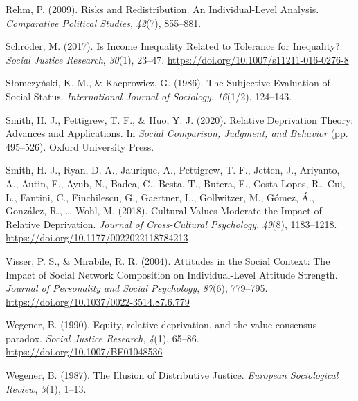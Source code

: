 \documentclass[
  12pt,
]{book}
\newlength{\cslhangindent}
\newlength{\cslentryspacingunit} %
\newenvironment{CSLReferences}[2] %
 {%
  \setlength{\parindent}{0pt}
  \ifodd #1
  \let\oldpar\par
  \def\par{\hangindent=\cslhangindent\oldpar}
  \fi
  \setlength{\parskip}{#2\cslentryspacingunit}
 }%
 {}
\begin{document}
\begin{CSLReferences}{1}{0}
\leavevmode{}%
Rehm, P. (2009). Risks and {Redistribution}. {An Individual-Level Analysis}. \emph{Comparative Political Studies}, \emph{42}(7), 855--881.

\leavevmode{}%
Schröder, M. (2017). Is {Income Inequality Related} to {Tolerance} for {Inequality}? \emph{Social Justice Research}, \emph{30}(1), 23--47. \url{https://doi.org/10.1007/s11211-016-0276-8}

\leavevmode{}%
Słomczyński, K. M., \& Kacprowicz, G. (1986). The {Subjective Evaluation} of {Social Status}. \emph{International Journal of Sociology}, \emph{16}(1/2), 124--143.

\leavevmode{}%
Smith, H. J., Pettigrew, T. F., \& Huo, Y. J. (2020). Relative {Deprivation Theory}: {Advances} and {Applications}. In \emph{Social {Comparison}, {Judgment}, and {Behavior}} (pp. 495--526). {Oxford University Press}.

\leavevmode{}%
Smith, H. J., Ryan, D. A., Jaurique, A., Pettigrew, T. F., Jetten, J., Ariyanto, A., Autin, F., Ayub, N., Badea, C., Besta, T., Butera, F., Costa-Lopes, R., Cui, L., Fantini, C., Finchilescu, G., Gaertner, L., Gollwitzer, M., Gómez, Á., González, R., \ldots{} Wohl, M. (2018). Cultural {Values Moderate} the {Impact} of {Relative Deprivation}. \emph{Journal of Cross-Cultural Psychology}, \emph{49}(8), 1183--1218. \url{https://doi.org/10.1177/0022022118784213}

\leavevmode{}%
Visser, P. S., \& Mirabile, R. R. (2004). Attitudes in the {Social Context}: {The Impact} of {Social Network Composition} on {Individual-Level Attitude Strength}. \emph{Journal of Personality and Social Psychology}, \emph{87}(6), 779--795. \url{https://doi.org/10.1037/0022-3514.87.6.779}

\leavevmode{}%
Wegener, B. (1990). Equity, relative deprivation, and the value consensus paradox. \emph{Social Justice Research}, \emph{4}(1), 65--86. \url{https://doi.org/10.1007/BF01048536}

\leavevmode{}%
Wegener, B. (1987). The {Illusion} of {Distributive Justice}. \emph{European Sociological Review}, \emph{3}(1), 1--13.

\end{CSLReferences}
\end{document}
